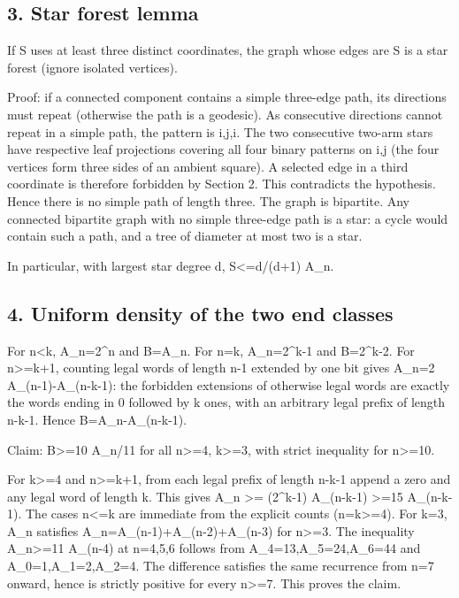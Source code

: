 \documentclass[
  11pt,
]{article}
\begin{document}
\subsection{3. Star forest lemma}\label{3-star-forest-lemma}

If S uses at least three distinct coordinates, the graph whose edges are
S is a star forest (ignore isolated vertices).

Proof: if a connected component contains a simple three-edge path, its
directions must repeat (otherwise the path is a geodesic). As
consecutive directions cannot repeat in a simple path, the pattern is
i,j,i. The two consecutive two-arm stars have respective leaf
projections covering all four binary patterns on i,j (the four vertices
form three sides of an ambient square). A selected edge in a third
coordinate is therefore forbidden by Section 2. This contradicts the
hypothesis. Hence there is no simple path of length three. The graph is
bipartite. Any connected bipartite graph with no simple three-edge path
is a star: a cycle would contain such a path, and a tree of diameter at
most two is a star.

In particular, with largest star degree d,
\textbar S\textbar\textless=d/(d+1) A\_n.

\subsection{4. Uniform density of the two end
classes}\label{4-uniform-density-of-the-two-end-classes}

For n\textless k, A\_n=2\^{}n and B=A\_n. For n=k, A\_n=2\^{}k-1 and
B=2\^{}k-2. For n\textgreater=k+1, counting legal words of length n-1
extended by one bit gives A\_n=2 A\_(n-1)-A\_(n-k-1): the forbidden
extensions of otherwise legal words are exactly the words ending in 0
followed by k ones, with an arbitrary legal prefix of length n-k-1.
Hence B=A\_n-A\_(n-k-1).

Claim: B\textgreater=10 A\_n/11 for all n\textgreater=4,
k\textgreater=3, with strict inequality for n\textgreater=10.

For k\textgreater=4 and n\textgreater=k+1, from each legal prefix of
length n-k-1 append a zero and any legal word of length k. This gives
A\_n \textgreater= (2\^{}k-1) A\_(n-k-1) \textgreater=15 A\_(n-k-1). The
cases n\textless=k are immediate from the explicit counts
(n=k\textgreater=4). For k=3, A\_n satisfies
A\_n=A\_(n-1)+A\_(n-2)+A\_(n-3) for n\textgreater=3. The inequality
A\_n\textgreater=11 A\_(n-4) at n=4,5,6 follows from
A\_4=13,A\_5=24,A\_6=44 and A\_0=1,A\_1=2,A\_2=4. The difference
satisfies the same recurrence from n=7 onward, hence is strictly
positive for every n\textgreater=7. This proves the claim.
\end{document}

